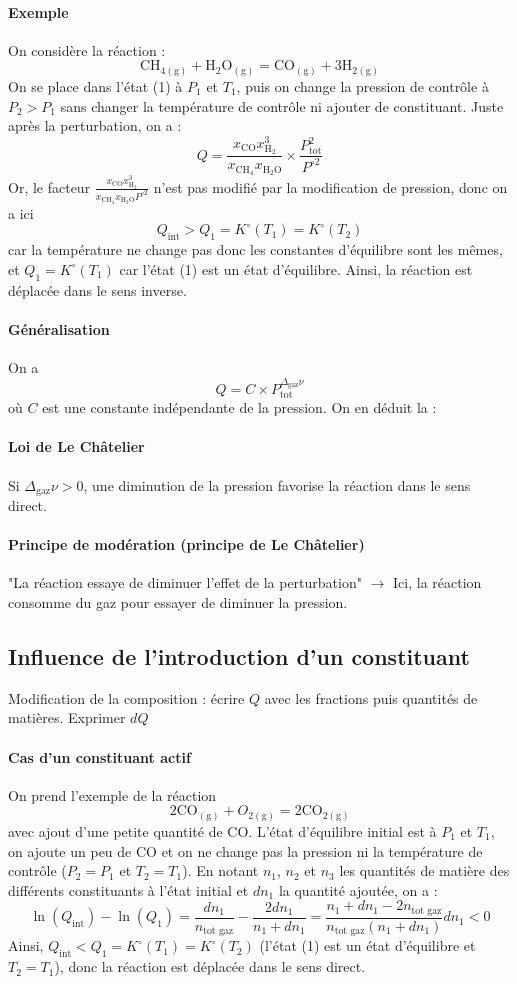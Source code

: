 \documentclass[french]{book}
\theoremstyle{plain}
\theoremstyle{definition}
\theoremstyle{remark}
\begin{document}
\paragraph{Exemple} On considère la réaction : $$\text{CH}_{4(\text{g})}+\text{H}_2\text{O}_{(\text{g})}=\text{CO}_{(\text{g})}+3\text{H}_{2(\text{g})}$$ On se place dans l'état (1) à $P_1$ et $T_1$, puis on change la pression de contrôle à $P_2>P_1$ sans changer la température de contrôle ni ajouter de constituant. Juste après la perturbation, on a : $$Q=\frac{x_\text{CO}x_{\text{H}_2}^3}{x_{\text{CH}_4}x_{\text{H}_2\text{O}}}\times\frac{P_\text{tot}^2}{P^{\circ 2}}$$ Or, le facteur $\displaystyle\frac{x_\text{CO}x_{\text{H}_2}^3}{x_{\text{CH}_4}x_{\text{H}_2\text{O}}P^{\circ 2}}$ n'est pas modifié par la modification de pression, donc on a ici $$Q_\text{int}>Q_1=K^\circ(T_1)=K^\circ(T_2)$$ car la température ne change pas donc les constantes d'équilibre sont les mêmes, et $Q_1=K^\circ(T_1)$ car l'état (1) est un état d'équilibre. Ainsi, la réaction est déplacée dans le sens inverse.
\paragraph{Généralisation} On a $$Q=C\times P_\text{tot}^{\Delta_\text{gaz}\nu}$$ où $C$ est une constante indépendante de la pression. On en déduit la :
\paragraph{Loi de Le Châtelier} Si $\Delta_\text{gaz}\nu>0$, une diminution de la pression favorise la réaction dans le sens direct.
\paragraph{Principe de modération (principe de Le Châtelier)} "La réaction essaye de diminuer l'effet de la perturbation" $\to$ Ici, la réaction consomme du gaz pour essayer de diminuer la pression.
\subsection{Influence de l'introduction d'un constituant}
Modification de la composition : écrire $Q$ avec les fractions puis quantités de matières. Exprimer $dQ$
\paragraph{Cas d'un constituant actif}
On prend l'exemple de la réaction $$2\text{CO}_{(\text{g})}+O_{2(\text{g})}=2\text{CO}_{2(\text{g})}$$ avec ajout d'une petite quantité de $\text{CO}$.  L'état d'équilibre initial est à $P_1$ et $T_1$, on ajoute un peu de $\text{CO}$ et on ne change pas la pression ni la température de contrôle ($P_2=P_1$ et $T_2=T_1$). En notant $n_1$, $n_2$ et $n_3$ les quantités de matière des différents constituants à l'état initial et $dn_1$ la quantité ajoutée, on a : $$\ln(Q_\text{int})-\ln(Q_1)=\frac{dn_1}{n_\text{tot gaz}}-\frac{2dn_1}{n_1+dn_1}=\frac{n_1+dn_1-2n_\text{tot gaz}}{n_\text{tot gaz}(n_1+dn_1)}dn_1<0$$ Ainsi, $Q_\text{int}<Q_1=K^\circ(T_1)=K^\circ(T_2)$ (l'état (1) est un état d'équilibre et $T_2=T_1$), donc la réaction est déplacée dans le sens direct.
\end{document}
